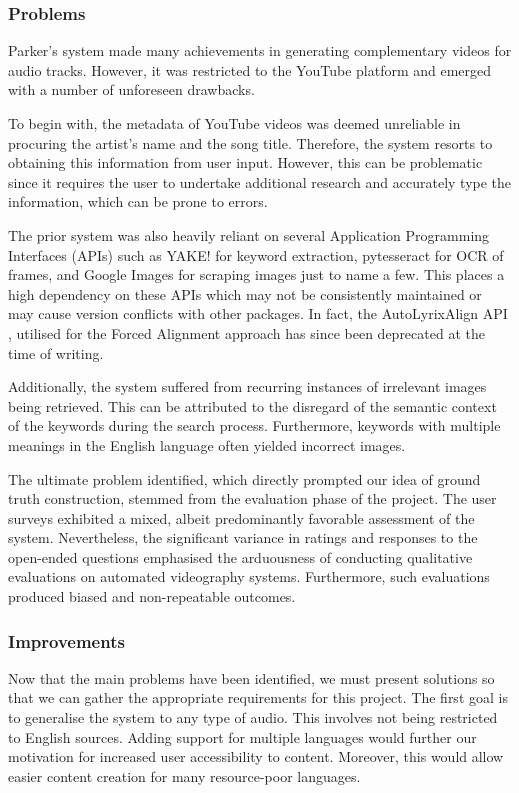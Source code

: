 \documentclass{l4proj}
\begin{document}
\subsubsection{Problems}
Parker's system made many achievements in generating complementary videos for audio tracks. However, it was restricted to the YouTube platform and emerged with a number of unforeseen drawbacks.

\label{par:metadata_problem}
To begin with, the metadata of YouTube videos was deemed unreliable in procuring the artist's name and the song title. Therefore, the system resorts to obtaining this information from user input. However, this can be problematic since it requires the user to undertake additional research and accurately type the information, which can be prone to errors. 

The prior system was also heavily reliant on several Application Programming Interfaces (APIs) such as YAKE! for keyword extraction, pytesseract \citep{pytesseract} for OCR of frames, and Google Images for scraping images just to name a few. This places a high dependency on these APIs which may not be consistently maintained or may cause version conflicts with other packages. In fact, the AutoLyrixAlign API \citep{gupta2020ala}, utilised for the Forced Alignment approach has since been deprecated at the time of writing.

Additionally, the system suffered from recurring instances of irrelevant images being retrieved. This can be attributed to the disregard of the semantic context of the keywords during the search process. Furthermore, keywords with multiple meanings in the English language often yielded incorrect images.

The ultimate problem identified, which directly prompted our idea of ground truth construction, stemmed from the evaluation phase of the project. The user surveys exhibited a mixed, albeit predominantly favorable assessment of the system. Nevertheless, the significant variance in ratings and responses to the open-ended questions emphasised the arduousness of conducting qualitative evaluations on automated videography systems. Furthermore, such evaluations produced biased and non-repeatable outcomes.

\subsubsection{Improvements}
Now that the main problems have been identified, we must present solutions so that we can gather the appropriate requirements for this project. The first goal is to generalise the system to any type of audio. This involves not being restricted to English sources. Adding support for multiple languages would further our motivation for increased user accessibility to content. Moreover, this would allow easier content creation for many resource-poor languages.
\end{document}

